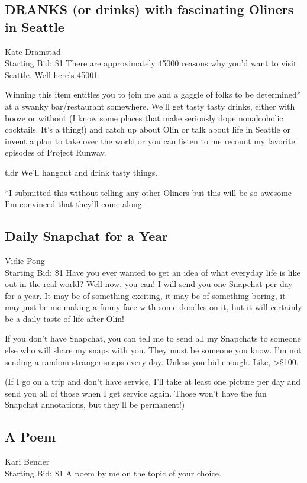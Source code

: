\documentclass[11pt]{article}
\begin{document}
\subsection{DRANKS (or drinks) with fascinating Oliners in Seattle}
Kate Dramstad
\\
Starting Bid: \$1
\newline
There are approximately 45000 reasons why you'd want to visit Seattle. Well here's 45001:

Winning this item entitles you to join me and a gaggle of folks to be determined* at a swanky bar/restaurant somewhere. We'll get tasty tasty drinks, either with booze or without (I know some places that make seriously dope nonalcoholic cocktails. It's a thing!) and catch up about Olin or talk about life in Seattle or invent a plan to take over the world or you can listen to me recount my favorite episodes of Project Runway.

tldr
We'll hangout and drink tasty things.

*I submitted this without telling any other Oliners but this will be so awesome I'm convinced that they'll come along.
\subsection{Daily Snapchat for a Year}
Vidie Pong
\\
Starting Bid: \$1
\newline
Have you ever wanted to get an idea of what everyday life is like out in the real world? Well now, you can! I will send you one Snapchat per day for a year. It may be of something exciting, it may be of something boring, it may just be me making a funny face with some doodles on it, but it will certainly be a daily taste of life after Olin!

If you don't have Snapchat, you can tell me to send all my Snapchats to someone else who will share my snaps with you. They must be someone you know. I'm not sending a random stranger snaps every day. Unless you bid enough. Like, >\$100.

(If I go on a trip and don't have service, I'll take at least one picture per day and send you all of those when I get service again. Those won't have the fun Snapchat annotations, but they'll be permanent!)
\subsection{A Poem}
Kari Bender
\\
Starting Bid: \$1
\newline
A poem by me on the topic of your choice.
\end{document}
